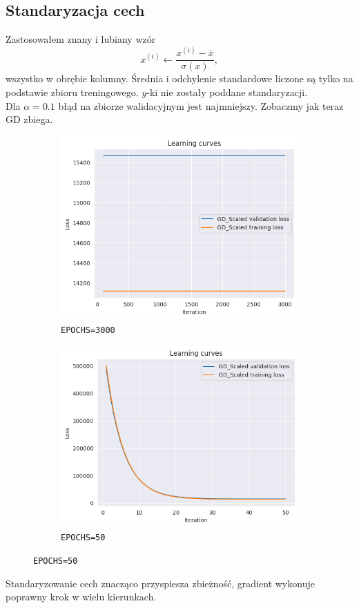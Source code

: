 \documentclass[a4paper,12pt]{article}
\begin{document}
\subsection{Standaryzacja cech}
Zastosowałem znany i lubiany wzór
\[x^{(i)} \leftarrow \frac{x^{(i)} - \overline{x}}{\sigma(x)},\]
wszystko w obrębie kolumny. Średnia i odchylenie standardowe liczone są tylko na podstawie zbioru treningowego. $y$-ki nie zostały poddane standaryzacji. \\
Dla $\alpha = 0.1$ błąd na zbiorze walidacyjnym jest najmniejszy. Zobaczmy jak teraz GD zbiega.
\begin{figure}[h!]
    \centering
    \begin{subfigure}[b]{0.45\textwidth}
        \includegraphics[width=\textwidth]{gd_scaled_parallel.png}
        \caption{\texttt{EPOCHS=3000}}
    \end{subfigure}
    \hfill
    \begin{subfigure}[b]{0.45\textwidth}
        \includegraphics[width=\textwidth]{gd_scaled.png}
        \caption{\texttt{EPOCHS=50}}
    \end{subfigure}
\end{figure}
Standaryzowanie cech znacząco przyspiesza zbieżność, gradient wykonuje poprawny krok w wielu kierunkach.
\end{document}
